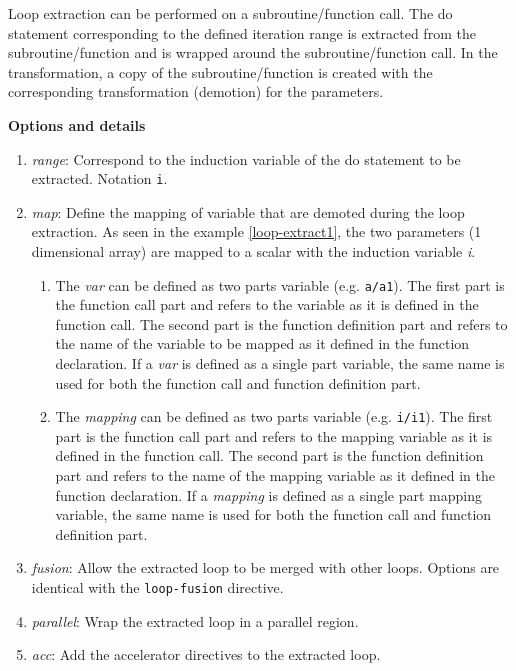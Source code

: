 Loop extraction can be performed on a subroutine/function call. The do statement corresponding
to the defined iteration range is extracted from the subroutine/function and is wrapped
around the subroutine/function call. In the transformation, a copy of the subroutine/function
is created with the corresponding transformation (demotion) for the parameters.


\textbf{Options and details}
\begin{enumerate}
\item \textit{range}: Correspond to the induction variable of the do statement
  to be extracted. Notation \lstinline!i!.
\item \textit{map}: Define the mapping of variable that are demoted during the
  loop extraction. As seen in the example \ref{loop-extract1}, the two
  parameters (1 dimensional array) are mapped to a scalar with the induction
  variable \textit{i}.
  \begin{enumerate}
    \item The \textit{var} can be defined as two parts variable (e.g.
    \lstinline!a/a1!). The first part is the function call part and refers to
    the variable as it is defined in the function call. The second part is the
    function definition part and refers to the name of the variable to be mapped
    as it defined in the function declaration. If a \textit{var} is defined as
    a single part variable, the same name is used for both the function call
    and function definition part.
    \item The \textit{mapping} can be defined as two parts variable (e.g.
    \lstinline!i/i1!). The first part is the function call part and refers
    to the mapping variable as it is defined in the function call. The second
    part is the function definition part and refers to the name of the mapping
    variable as it defined in the function declaration. If a \textit{mapping}
    is defined as a single part mapping variable, the same name is used for
    both the function call and function definition part.
    \end{enumerate}
\item \textit{fusion}: Allow the extracted loop to be merged with other loops.
Options are identical with the \lstinline!loop-fusion! directive.
\item \textit{parallel}: Wrap the extracted loop in a parallel region.
\item \textit{acc}: Add the accelerator directives to the extracted loop.
\end{enumerate}

